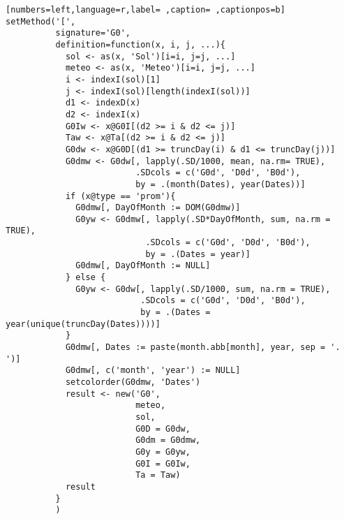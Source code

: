 \begin{lstlisting}[numbers=left,language=r,label= ,caption= ,captionpos=b]
setMethod('[',
          signature='G0',
          definition=function(x, i, j, ...){
            sol <- as(x, 'Sol')[i=i, j=j, ...] 
            meteo <- as(x, 'Meteo')[i=i, j=j, ...] 
            i <- indexI(sol)[1]
            j <- indexI(sol)[length(indexI(sol))]
            d1 <- indexD(x)
            d2 <- indexI(x)
            G0Iw <- x@G0I[(d2 >= i & d2 <= j)]
            Taw <- x@Ta[(d2 >= i & d2 <= j)]
            G0dw <- x@G0D[(d1 >= truncDay(i) & d1 <= truncDay(j))]
            G0dmw <- G0dw[, lapply(.SD/1000, mean, na.rm= TRUE),
                          .SDcols = c('G0d', 'D0d', 'B0d'),
                          by = .(month(Dates), year(Dates))]
            if (x@type == 'prom'){
              G0dmw[, DayOfMonth := DOM(G0dmw)]
              G0yw <- G0dmw[, lapply(.SD*DayOfMonth, sum, na.rm = TRUE),
                            .SDcols = c('G0d', 'D0d', 'B0d'),
                            by = .(Dates = year)]
              G0dmw[, DayOfMonth := NULL]
            } else {
              G0yw <- G0dw[, lapply(.SD/1000, sum, na.rm = TRUE),
                           .SDcols = c('G0d', 'D0d', 'B0d'),
                           by = .(Dates = year(unique(truncDay(Dates))))]
            }
            G0dmw[, Dates := paste(month.abb[month], year, sep = '. ')]
            G0dmw[, c('month', 'year') := NULL]
            setcolorder(G0dmw, 'Dates')
            result <- new('G0',
                          meteo,
                          sol,
                          G0D = G0dw,
                          G0dm = G0dmw,
                          G0y = G0yw,
                          G0I = G0Iw,
                          Ta = Taw)
            result
          }
          )



\end{lstlisting}
